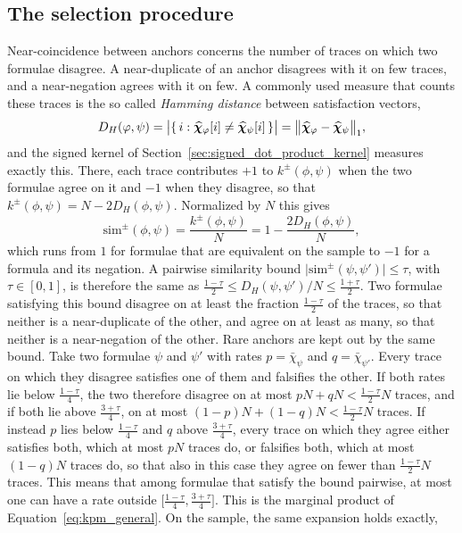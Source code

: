 \documentclass[titlepage,a4paper,11pt]{report}
\begin{document}
    \subsection{The selection procedure}\label{sec:selection_procedure}
    Near-coincidence between anchors concerns the number of traces on which two formulae disagree. A near-duplicate of an anchor disagrees with it on few traces, and a near-negation agrees with it on few. A commonly used measure that counts these traces is the so called \textit{Hamming distance} between satisfaction vectors,
    \begin{equation}\label{eq:hamming_distance}
        D_H(\varphi,\psi)=\bigl|\{\,i:\bm{\widehat\chi}_\varphi[i]\neq\bm{\widehat\chi}_\psi[i]\,\}\bigr|=\bigl\lVert\bm{\widehat\chi}_\varphi-\bm{\widehat\chi}_\psi\bigr\rVert_1 ,
    \end{equation}
    and the signed kernel of Section~\ref{sec:signed_dot_product_kernel} measures exactly this. There, each trace contributes $+1$ to $k^\pm(\phi,\psi)$ when the two formulae agree on it and $-1$ when they disagree, so that $k^\pm(\phi,\psi)=N-2D_H(\phi,\psi)$. Normalized by $N$ this gives
    \begin{equation}\label{eq:sim_pm}
        \mathrm{sim}^\pm(\phi,\psi)=\frac{k^\pm(\phi,\psi)}{N}=1-\frac{2D_H(\phi,\psi)}{N},
    \end{equation}
    which runs from $1$ for formulae that are equivalent on the sample to $-1$ for a formula and its negation. A pairwise similarity bound  $\lvert\mathrm{sim}^\pm(\psi,\psi')\rvert\le\tau$, with $\tau \in [0,1]$, is therefore the same as $\frac{1-\tau}{2}\le D_H(\psi,\psi')/N\le\frac{1+\tau}{2}$. Two formulae satisfying this bound disagree on at least the fraction $\frac{1-\tau}{2}$ of the traces, so that neither is a near-duplicate of the other, and agree on at least as many, so that neither is a near-negation of the other. Rare anchors are kept out by the same bound. Take two formulae $\psi$ and $\psi'$ with rates $p=\bar\chi_\psi$ and $q=\bar\chi_{\psi'}$. Every trace on which they disagree satisfies one of them and falsifies the other. If both rates lie below $\frac{1-\tau}{4}$, the two therefore disagree on at most $pN+qN<\frac{1-\tau}{2}N$ traces, and if both lie above $\frac{3+\tau}{4}$, on at most $(1-p)N+(1-q)N<\frac{1-\tau}{2}N$ traces. If instead $p$ lies below $\frac{1-\tau}{4}$ and $q$ above $\frac{3+\tau}{4}$, every trace on which they agree either satisfies both, which at most $pN$ traces do, or falsifies both, which at most $(1-q)N$ traces do, so that also in this case they agree on fewer than $\frac{1-\tau}{2}N$ traces. This means that among formulae that satisfy the bound pairwise, at most one can have a rate outside $\bigl[\frac{1-\tau}{4},\frac{3+\tau}{4}\bigr]$. This is the marginal product of Equation~\eqref{eq:kpm_general}. On the sample, the same expansion holds exactly,
\end{document}

